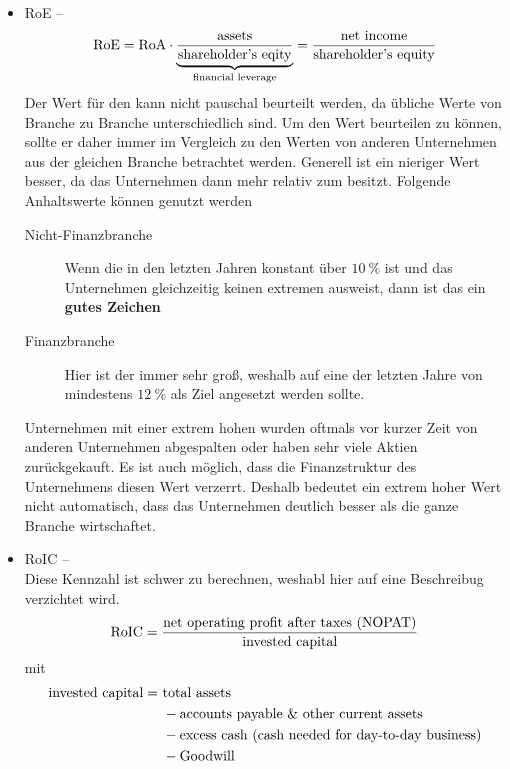 \begin{itemize}
    \item RoE -- 
    \begin{align}
        \text{RoE} = \text{RoA} \cdot \underbrace{\frac{\text{assets}}{\text{shareholder's eqity}}}_{\text{financial leverage}} = \frac{\text{net income}}{\text{shareholder's equity}}
    \end{align}
    Der Wert für den \financialLeverage kann nicht pauschal beurteilt werden, da übliche Werte von Branche zu Branche unterschiedlich sind. 
    Um den Wert beurteilen zu können, sollte er daher immer im Vergleich zu den Werten von anderen Unternehmen aus der gleichen Branche betrachtet werden.
    Generell ist ein nieriger Wert besser, da das Unternehmen dann mehr \shareholdersEquity relativ zum \assets besitzt.
    Folgende Anhaltswerte können genutzt werden
    \begin{description}
        \item[Nicht-Finanzbranche] Wenn die \returnOnEquity in den letzten Jahren konstant über $\SI{10}{\percent}$ ist und das Unternehmen gleichzeitig keinen extremen \financialLeverage ausweist, dann ist das ein \textbf{gutes Zeichen}
        \item[Finanzbranche] Hier ist der \financialLeverage immer sehr groß, weshalb auf eine \returnOnEquity der letzten Jahre von mindestens $\SI{12}{\percent}$ als Ziel angesetzt werden sollte.
    \end{description}
    Unternehmen mit einer extrem hohen \returnOnEquity wurden oftmals vor kurzer Zeit von anderen Unternehmen abgespalten oder haben sehr viele Aktien zurückgekauft. 
    Es ist auch möglich, dass die Finanzstruktur des Unternehmens diesen Wert verzerrt.
    Deshalb bedeutet ein extrem hoher Wert nicht automatisch, dass das Unternehmen deutlich besser als die ganze Branche wirtschaftet. 

    \item RoIC -- \\
    Diese Kennzahl ist schwer zu berechnen, weshabl hier auf eine Beschreibug verzichtet wird.
    \begin{align}
        \text{RoIC} = \frac{\text{net operating profit after taxes (NOPAT)}}{\text{invested capital}}
    \end{align}
    mit
    \begin{align}
        \begin{split}
            \text{invested capital} =\ &\text{total assets}\\ &- \text{accounts payable \& other current assets} \\ &- \text{excess cash (cash needed for day-to-day business)}\\ &- \text{Goodwill}
        \end{split}
    \end{align}
\end{itemize}

